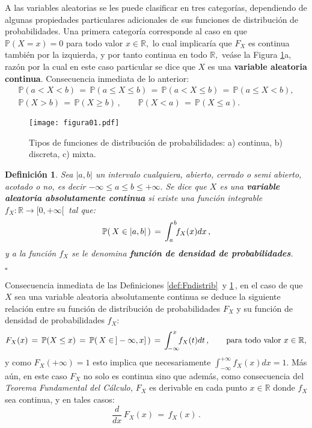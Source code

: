\documentclass[spanish,10pt,letterpaper]{article}
\newtheorem{defi}{Definición}
\newcommand{\prob}{\mathbb{P}}
\newcommand{\Runo}{\mathbb{R}}
\newcommand{\qed}{\begin{flushright}$\square$\end{flushright}}
\begin{document}
    \bigskip 
	
	A las variables aleatorias se les puede clasificar en tres categorías, dependiendo de algunas propiedades particulares adicionales de sus funciones de distribución de probabilidades. Una primera categoría corresponde al caso en que $\prob(X=x)=0$ para todo valor $x\in\Runo,$ lo cual implicaría que $F_X$ es continua también por la izquierda, y por tanto continua en todo $\Runo,$ veáse la Figura \ref{fig:Fdistrib}a, razón por la cual en este caso particular se dice que $X$ es una \textbf{variable aleatoria continua}. Consecuencia inmediata de lo anterior:
	\begin{align}\label{eq:vacontinua}
		\prob(a<X<b) \,=\, \prob(a\leq X\leq b) \,=\, \prob(a<X\leq b) \,=\, \prob(a\leq X<b), \\
		\prob(X>b) \,=\,\prob(X \geq b)\,,\qquad \prob(X<a)\,=\,\prob(X\leq a).
	\end{align}

    \bigskip

    \begin{figure}[ht]
	\begin{center} 
		\texttt{[image: figura01.pdf]}
	\end{center}
	\caption{Tipos de funciones de distribución de probabilidades: a) continua, b) discreta, c) mixta.}
	\label{fig:Fdistrib}
     \end{figure}

	\bigskip 
	
	\begin{defi}\label{def:vaabscont}
		Sea $|a,b|$ un intervalo cualquiera, abierto, cerrado o semi abierto, acotado o no, es decir $-\infty\leq a\leq b\leq+\infty.$ Se dice que $X$ es una \textbf{variable aleatoria absolutamente continua} si existe una función integrable $f_X:\Runo\rightarrow[0,+\infty[\,$ tal que:
		$$\prob(\,X\in|a,b|\,) \,=\, \int_{a}^{\hspace{0.25mm}b}\!\!f_X(x)dx\,,$$
		y a la función $f_X$ se le denomina \textbf{función de densidad de probabilidades}. \qed 
	\end{defi}
	
	Consecuencia inmediata de las Definiciones \ref{def:Fndistrib}\, y \ref{def:vaabscont}\,, en el caso de que $X$ sea una variable aleatoria absolutamente continua se deduce la siguiente relación entre su función de distribución de probabilidades $F_X$ y su función de densidad de probabilidades $f_X:$
	\begin{equation}\label{eq:fdp}
		F_X(x) \,=\, \prob(X\leq x) \,=\, \prob(\,X\in\,]-\infty,x]\,) \,=\, \int_{\!-\infty}^{\hspace{0.25mm}x}\!\!f_X(t)dt\,,\qquad\text{para todo valor } x \in\Runo,
	\end{equation}
	y como $F_X(+\infty)=1$ esto implica que necesariamente $\int_{-\infty}^{+\infty}f_X(x)dx=1.$ Más aún, en este caso $F_X$ no solo es continua sino que además, como consecuencia del \textit{Teorema Fundamental del Cálculo,} $F_X$ es derivable en cada punto $x\in\Runo$ donde $f_X$ sea continua, y en tales casos:
	\begin{equation}\label{eq:fdp2}
		\frac{d}{dx}\,F_X(x) \,=\, f_X(x)\,.
	\end{equation}
	
\end{document}
